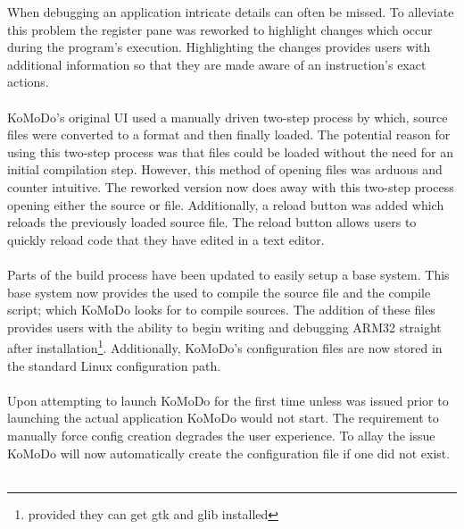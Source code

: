   When debugging an application intricate details can often be missed. To alleviate this problem the register pane was reworked to highlight changes which occur during the program's execution. Highlighting the changes provides users with additional information so that they are made aware of an instruction's exact actions.\\\\
  KoMoDo's original UI used a manually driven two-step process by which, source files were converted to a  format and then finally loaded. The potential reason for using this two-step process was that  files could be loaded without the need for an initial compilation step. However, this method of opening files was arduous and counter intuitive. The reworked version now does away with this two-step process opening either the source or  file. Additionally, a reload button was added which reloads the previously loaded source file. The reload button allows users to quickly reload code that they have edited in a text editor.\\\\
  Parts of the build process have been updated to easily setup a base system. This base system now provides the  used to compile the source file and the compile script; which KoMoDo looks for to compile sources. The addition of these files provides users with the ability to begin writing and debugging ARM32 straight after installation\footnote{provided they can get gtk and glib installed}. Additionally, KoMoDo's configuration files are now stored in the standard Linux configuration path.\\\\
  Upon attempting to launch KoMoDo for the first time unless  was issued prior to launching the actual application KoMoDo would not start. The requirement to manually force config creation degrades the user experience. To allay the issue KoMoDo will now automatically create the configuration file if one did not exist.\\\\
